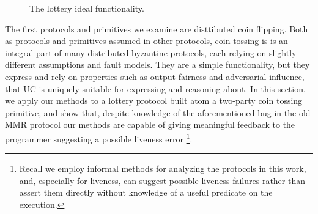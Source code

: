 \begin{figure}
\centering

\caption{The lottery ideal functionality.}
\label{fig:flotto}
\end{figure}


%




The first protocols and primitives we examine are disttibuted coin flipping. 
Both as protocols and primitives assumed in other protocols, coin tossing is is an integral part of many distributed byzantine protocols, each relying on slightly different assumptions and fault models. 
They are a simple functionality, but they express and rely on properties such as output fairness and adversarial influence, that UC is uniquely suitable for expressing and reasoning about.
In this section, we apply our methods to a lottery protocol built atom a two-party coin tossing primitive, and show that, despite knowledge of the aforementioned bug in the old MMR protocol our methods are capable of giving meaningful feedback to the programmer suggesting a possible liveness error \footnote{Recall we employ informal methods for analyzing the protocols in this work, and, especially for liveness, can suggest possible liveness failures rather than assert them directly without knowledge of a useful predicate on the execution.}.

